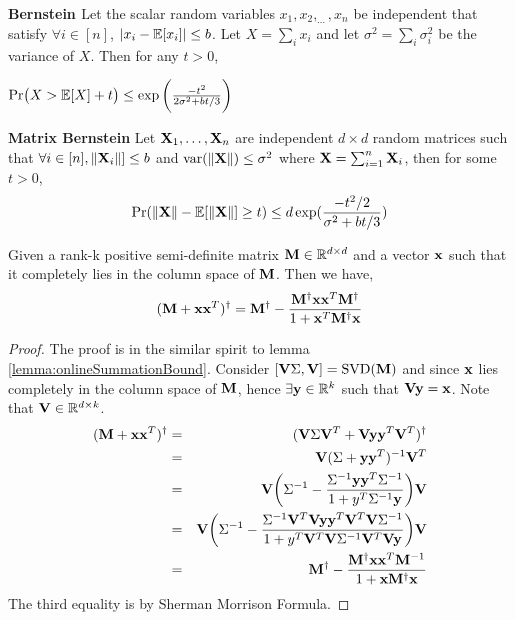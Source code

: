 % 
\begin{theorem}{\label{thm:bernstein}}
\textbf{Bernstein \cite{dubhashi2009concentration}} Let the scalar random variables $x_{1}, x_{2}, _{\cdots}, x_{n}$ be independent that satisfy $\forall i \in [n]$,  
$\vert x_{i}-\~E[x_{i}]\vert \leq b$. 
Let $X = \sum_{i} x_{i}$ and let $\sigma^{2} = \sum_{i} \sigma_{i}^{2}$ be the variance of $X$. 
Then for any $t>0$,
\begin{center}
 $\mbox{Pr}\big(X > \~E[X] + t\big) \leq \exp\bigg(\frac{-t^{2}}{2\sigma^{2}+bt/3} \bigg)$
\end{center}
\end{theorem}
% 
\begin{theorem}{\label{thm:matrixBernstein}}
 \textbf{Matrix Bernstein\cite{tropp2015introduction}} Let $\*X_{1},\ldots,\*X_{n}$ are independent $d \times d$ random matrices such that $\forall i \in [n], \|\*X_{i}\|] \leq b$ and $\mbox{var}(\|\*X\|) \leq \sigma^{2}$ where $\*X = \sum_{i=1}^{n}\*X_{i}$, then for some $t>0$,
 $$\mbox{Pr}(\|\*X\| - \~E[\|\*X\|] \geq t) \leq d\exp(\frac{-t^{2}/2}{\sigma^{2}+bt/3})$$
\end{theorem}
% 
\begin{lemma}{\label{lemma:modified-SM}}
 Given a rank-k positive semi-definite matrix $\*M \in \~R^{d \times d}$ and a vector $\*x$ such that it completely lies in the column space of $\*M$. Then we have,
 $$(\*M + \*x\*x^{T})^{\dagger} = \*M^{\dagger} - \frac{\*M^{\dagger}\*x\*x^{T}\*M^{\dagger}}{1+\*x^{T}\*M^{\dagger}\*x} $$
\end{lemma}
\begin{proof}
 The proof is in the similar spirit to lemma \ref{lemma:onlineSummationBound}. Consider $[\*V\Sigma,\*V] = \mbox{SVD}(\*M)$ and since $\*x$ lies completely in the column space of $\*M$, hence $\exists \*y \in \~R^{k}$ such that $\*V\*y = \*x$. Note that $\*V \in \~R^{d \times k}$.
 \begin{eqnarray*}
  (\*M + \*x\*x^{T})^{\dagger} &=& (\*V\Sigma\*V^{T}+\*V\*y\*y^{T}\*V^{T})^{\dagger} \\
  &=& \*V(\Sigma+\*y\*y^{T})^{-1}\*V^{T} \\
  &=& \*V\bigg(\Sigma^{-1} - \frac{\Sigma^{-1}\*y\*y^{T}\Sigma^{-1}}{1+y^{T}\Sigma^{-1}\*y}\bigg)\*V \\
  &=& \*V\bigg(\Sigma^{-1}-\frac{\Sigma^{-1}\*V^{T}\*V\*y\*y^{T}\*V^{T}\*V\Sigma^{-1}}{1+y^{T}\*V^{T}\*V\Sigma^{-1}\*V^{T}\*V\*y}\bigg)\*V\\
  &=& \*M^{\dagger} - \frac{\*M^{\dagger}\*x\*x^{T}\*M^{-1}}{1+\*x\*M^{\dagger}\*x}
 \end{eqnarray*}
 The third equality is by Sherman Morrison Formula.
\end{proof}
